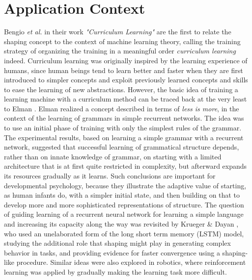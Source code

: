 \section{Application Context}
Bengio \textit{et al.} \cite{bengio2009curriculum} in their work \textsl{"Curriculum Learning"} are the first to relate the shaping concept
to the context of machine learning theory, calling the training strategy of organizing the training in a meaningful order \textit{curriculum learning} indeed.
Curriculum learning was originally inspired by the learning experience of humans, since human beings tend to learn better and faster when 
they are first introduced to simpler concepts and exploit previously learned concepts and skills to ease the learning of new abstractions.
However, the basic idea of training a learning machine with a curriculum method can be traced back
at the very least to Elman \cite{ELMAN199371}. Elman realized a concept described in terms of \textit{less is more}, in the context of the learning 
of grammars in simple recurrent networks. The idea was to use an initial phase of training with only the simplest rules of the grammar.
The experimental results, based on learning a simple grammar with a recurrent network, suggested that
successful learning of grammatical structure depends, rather than on innate knowledge of grammar,
on starting with a limited architecture that is at first quite restricted in complexity, but afterward expands its resources
gradually as it learns. Such conclusions are important for developmental psychology, because they 
illustrate the adaptive value of starting, as human infants do, with a simpler initial state, and then building on that to develop
more and more sophisticated representations of structure. The question of guiding learning of a recurrent neural network for learning
a simple language and increasing its capacity along the way was revisited by Krueger \& Dayan \cite{krueger2009},
who used an unelaborated form of the 
long short term memory (LSTM) model, studying
the additional role that shaping might play in generating complex behavior in tasks, and providing
evidence for faster convergence using a shaping-like procedure. Similar ideas were also explored
in robotics, where reinforcement learning was applied by gradually making the learning task more difficult.

